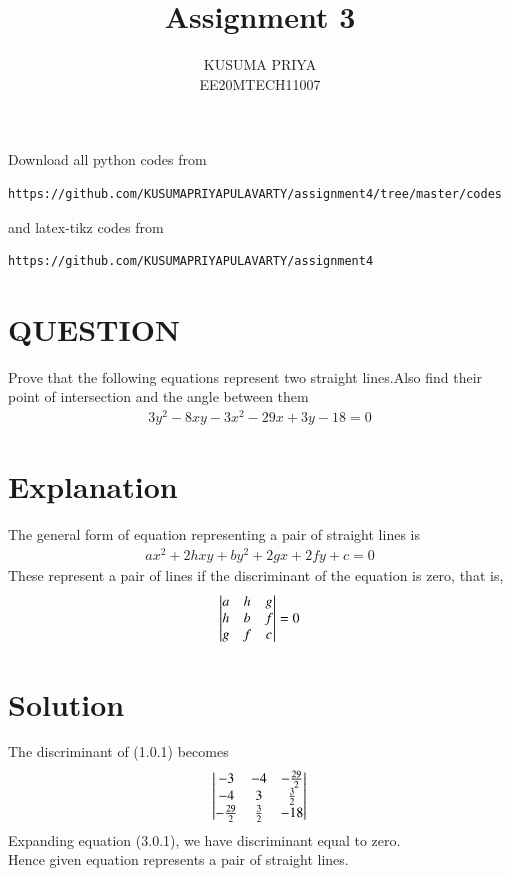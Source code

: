 \documentclass[journal,12pt,twocolumn]{IEEEtran}
\begin{document}
\renewcommand{\thefigure}{\theproblem}

\def\putbox#1#2#3{\makebox[0in][l]{\makebox[#1][l]{}\raisebox{\baselineskip}[0in][0in]{\raisebox{#2}[0in][0in]{#3}}}}
     \def\rightbox#1{\makebox[0in][r]{#1}}
     \def\centbox#1{\makebox[0in]{#1}}
     \def\topbox#1{\raisebox{-\baselineskip}[0in][0in]{#1}}
     \def\midbox#1{\raisebox{-0.5\baselineskip}[0in][0in]{#1}}
\vspace{3cm}
\title{Assignment 3}
\author{KUSUMA PRIYA\\EE20MTECH11007}

\maketitle
\newpage

\bigskip
\renewcommand{\thefigure}{\theenumi}
\renewcommand{\thetable}{\theenumi}
Download all python codes from 
\begin{lstlisting}
https://github.com/KUSUMAPRIYAPULAVARTY/assignment4/tree/master/codes
\end{lstlisting}
%
and latex-tikz codes from 
%
\begin{lstlisting}
https://github.com/KUSUMAPRIYAPULAVARTY/assignment4
\end{lstlisting}
%
 
 \section{QUESTION}
Prove that the following equations represent two straight lines.Also find their point of intersection and the angle between them
\begin{align}
 3y^2-8xy-3x^2-29x+3y-18=0   
\end{align}

%

\section{Explanation}
The general form of equation representing a pair of straight lines is 
\begin{align}
    ax^2+2hxy+by^2+2gx+2fy+c=0
\end{align}
These represent a pair of lines if the discriminant of the equation is zero, that is,
\begin{align}
\begin{vmatrix}a&h&g\\h&b&f\\g&f&c\end{vmatrix}=0
\end{align}
\section{Solution}
The discriminant of (1.0.1) becomes
\begin{align}
    \begin{vmatrix}-3&-4&-\frac{29}{2}\\-4&3&\frac{3}{2}\\-\frac{29}{2}&\frac{3}{2}&-18\end{vmatrix}
\end{align}
Expanding equation (3.0.1), we have discriminant equal to zero.\\
Hence given equation represents a pair of straight lines.
\end{document}
